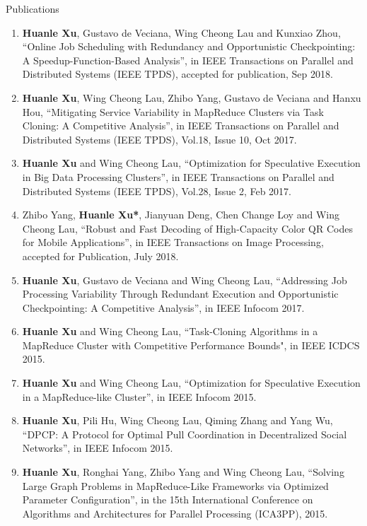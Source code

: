 \documentclass{resume} %
\begin{document}
\begin{rSection}{Publications}
\begin{enumerate}
    \setlength{\leftmargin}{0em}
    \setlength{\itemsep}{0.2em}
    \setlength{\parskip}{0pt}
    \item \textbf{Huanle Xu}, Gustavo de Veciana, Wing Cheong Lau and Kunxiao Zhou, ``Online Job Scheduling with Redundancy and Opportunistic Checkpointing: A Speedup-Function-Based Analysis'', in IEEE Transactions on Parallel and Distributed Systems ({IEEE TPDS}), accepted for publication, Sep 2018. 
    \item \textbf{Huanle Xu}, Wing Cheong Lau, Zhibo Yang, Gustavo de Veciana and Hanxu Hou, ``Mitigating Service Variability in MapReduce Clusters via Task Cloning: A Competitive Analysis'', in IEEE Transactions on Parallel and Distributed Systems ({IEEE TPDS}), Vol.18, Issue 10, Oct 2017. 
    \item {\bf Huanle Xu} and Wing Cheong Lau, ``Optimization for Speculative Execution in Big Data Processing Clusters'', in IEEE Transactions on Parallel and Distributed Systems ({IEEE TPDS}), Vol.28, Issue 2, Feb 2017. 
    \item Zhibo Yang, {\bf Huanle Xu*}, Jianyuan Deng, Chen Change Loy and Wing Cheong Lau, ``Robust and Fast Decoding of High-Capacity Color QR Codes for Mobile Applications'', in IEEE Transactions on Image Processing, accepted for Publication, July 2018.
    \item \textbf{Huanle Xu}, Gustavo de Veciana and  Wing Cheong Lau, ``Addressing Job Processing Variability Through Redundant Execution and Opportunistic Checkpointing:  A Competitive Analysis'', in {IEEE Infocom} 2017. 
    \item \textbf{Huanle Xu} and Wing Cheong Lau, ``Task-Cloning Algorithms in a MapReduce Cluster with Competitive Performance Bounds", in {IEEE ICDCS} 2015.
    \item \textbf{Huanle Xu} and Wing Cheong Lau, ``Optimization for Speculative Execution in a MapReduce-like Cluster'', in {IEEE Infocom} 2015.
    \item \textbf{Huanle Xu}, Pili Hu, Wing Cheong Lau, Qiming Zhang and Yang Wu, ``DPCP: A Protocol for Optimal Pull Coordination in Decentralized Social Networks'', in {IEEE Infocom} 2015.
    \item \textbf{Huanle Xu}, Ronghai Yang, Zhibo Yang and Wing Cheong Lau, ``Solving Large Graph Problems in MapReduce-Like Frameworks via Optimized Parameter Configuration'', in the 15th International Conference on Algorithms and Architectures for Parallel Processing (ICA3PP), 2015.

\end{enumerate}
\end{rSection}
\end{document}
